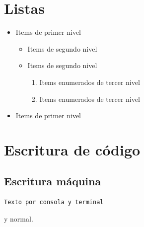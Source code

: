 \documentclass{article}
\begin{document}
\section{Listas}
\begin{itemize}
\item Items de primer nivel
\begin{itemize}
\item Items de segundo nivel 
\item Items de segundo nivel
\begin{enumerate}
\item Items enumerados de tercer nivel
\item Items enumerados de tercer nivel
\end{enumerate}
\end{itemize}
\item Items de primer nivel
\end{itemize}
\section{Escritura de código}
\subsection{Escritura máquina}
\begin{verbatim}
Texto por consola y terminal
\end{verbatim}
y normal.
\end{document}

